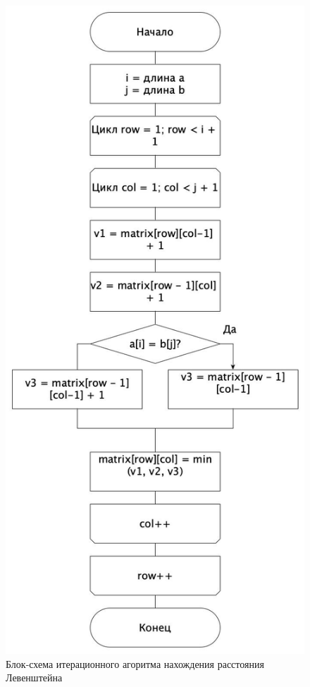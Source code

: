 \documentclass[12pt]{report}
\begin{document}
    \begin{figure}[H]
        \centering
        \includegraphics[width=0.6\linewidth]{img/levCasual}
        \caption{Блок-схема итерационного агоритма нахождения расстояния Левенштейна}
        \label{fig:levCasual}
    \end{figure}
\end{document}
